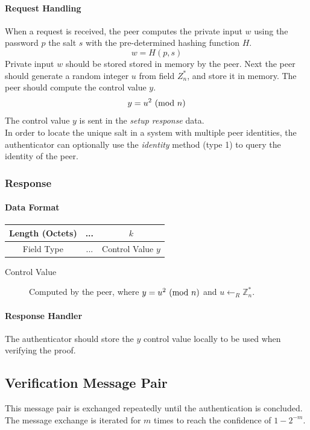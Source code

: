\paragraph{Request Handling} When a request is received, the peer computes the private input $w$ using the password $p$ the salt $s$ with the pre-determined hashing function $H$.
$$w = H(p, s)$$
Private input $w$ should be stored stored in memory by the peer. 
Next the peer should generate a random integer $u$ from field $Z^*_n$, and store it in memory.
The peer should compute the control value $y$.
$$y = u^2 \ (\mathrm{mod}\ n)$$
The control value $y$ is sent in the \textit{setup response} data.
\bigskip
\\
In order to locate the unique salt in a system with multiple peer identities, the authenticator can optionally use the \textit{identity} method (type 1) to query the identity of the peer.


\subsubsection{Response}

\paragraph{Data Format}

\begin{center}
\begin{tabular}{|c|c|c|}
	\hline
	Length (Octets) & ... & $k$ \\
	\hline
	Field Type & ... & Control Value $y$\\
	\hline
\end{tabular}
\end{center}

\bigskip

\begin{description}
	\item[Control Value] Computed by the peer, where $y = u^2 \ (\mathrm{mod}\ n)$ and $u \leftarrow_R \mathbb{Z}^*_n$.
\end{description}

\paragraph{Response Handler}
The authenticator should store the $y$ control value locally to be used when verifying the proof.

\subsection{Verification Message Pair}
This message pair is exchanged repeatedly until the authentication is concluded.
The message exchange is iterated for $m$ times to reach the confidence of $1 - 2^{-m}$.

